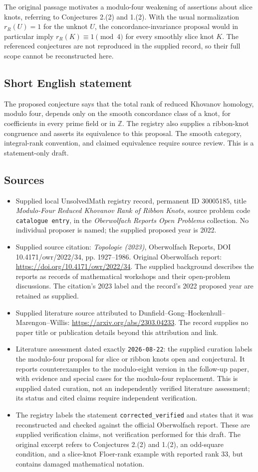 \documentclass[11pt]{article}
\begin{document}
The original passage motivates a modulo-four weakening of assertions about slice knots, referring to Conjectures 2.(2) and 1.(2). With the usual normalization \(r_R(U)=1\) for the unknot \(U\), the concordance-invariance proposal would in particular imply \(r_R(K)\equiv1\pmod4\) for every smoothly slice knot \(K\). The referenced conjectures are not reproduced in the supplied record, so their full scope cannot be reconstructed here.
\subsection{Short English statement}
The proposed conjecture says that the total rank of reduced Khovanov homology, modulo four, depends only on the smooth concordance class of a knot, for coefficients in every prime field or in \(\mathbb Z\). The registry also supplies a ribbon-knot congruence and asserts its equivalence to this proposal. The smooth category, integral-rank convention, and claimed equivalence require source review. This is a statement-only draft.
\subsection{Sources}
\begin{itemize}
\item Supplied local UnsolvedMath registry record, permanent ID \(30005185\), title \emph{Modulo-Four Reduced Khovanov Rank of Ribbon Knots}, source problem code \texttt{catalogue entry}, in the \emph{Oberwolfach Reports Open Problems} collection. No individual proposer is named; the supplied proposed year is 2022.
\item Supplied source citation: \emph{Topologie (2023)}, Oberwolfach Reports, DOI 10.4171/owr/2022/34, pp. 1927--1986. Original Oberwolfach report: \url{https://doi.org/10.4171/owr/2022/34}. The supplied background describes the reports as records of mathematical workshops and their open-problem discussions. The citation's 2023 label and the record's 2022 proposed year are retained as supplied.
\item Supplied literature source attributed to Dunfield--Gong--Hockenhull--Marengon--Willis: \url{https://arxiv.org/abs/2303.04233}. The record supplies no paper title or publication details beyond this attribution and link.
\item Literature assessment dated exactly \texttt{2026-08-22}: the supplied curation labels the modulo-four proposal for slice or ribbon knots open and conjectural. It reports counterexamples to the modulo-eight version in the follow-up paper, with evidence and special cases for the modulo-four replacement. This is supplied dated curation, not an independently verified literature assessment; its status and cited claims require independent verification.
\item The registry labels the statement \texttt{corrected\_verified} and states that it was reconstructed and checked against the official Oberwolfach report. These are supplied verification claims, not verification performed for this draft. The original excerpt refers to Conjectures 2.(2) and 1.(2), an odd-square condition, and a slice-knot Floer-rank example with reported rank 33, but contains damaged mathematical notation.
\end{itemize}
\end{document}
